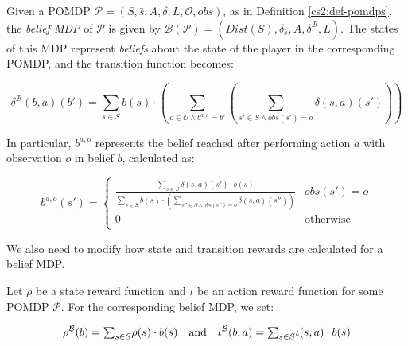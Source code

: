 \begin{definition}
    \label{cs2:belief_mdps}

    Given a POMDP $\mathcal{P} = (S, \bar{s}, A, \delta, L, \mathcal{O}, obs)$, as in Definition \ref{cs2:def-pomdps}, the \emph{belief MDP} of $\mathcal{P}$ is given by $\mathcal{B}(\mathcal{P}) = (Dist(S), \delta_{\bar{s}}, A, \delta^\mathcal{B}, L)$. The states of this MDP represent \emph{beliefs} about the state of the player in the corresponding POMDP, and the transition function becomes:

    \begin{equation*}
        \delta^{\mathcal{B}}(b, a)(b') = \mbox{$\sum_{s \in S}$} b(s) \cdot \left( \mbox{$\sum_{o \in \mathcal{O} \wedge b^{a,o} = b'}$} \left(  \mbox{$\sum_{s' \in S \wedge obs(s')=o}$} \delta(s, a)(s') \right) \right)
    \end{equation*}

    In particular, $b^{a, o}$ represents the belief reached after performing action $a$ with observation $o$ in belief $b$, calculated as:

    \begin{equation*}
        b^{a, o}(s') =
        \begin{cases}
            \frac{\displaystyle \mbox{$\sum\nolimits_{s \in S}$} \delta(s, a)(s') \cdot b(s)}{\displaystyle \mbox{$\sum\nolimits_{s \in S}$} b(s) \cdot \left(\mbox{$\sum_{s'' \in S \wedge obs(s'')=o}$} \delta(s,a)(s'')\right)} & obs(s') = o \\ 0 & \text{otherwise} \\
        \end{cases}
    \end{equation*}

\end{definition}

We also need to modify how state and transition rewards are calculated for a belief MDP.

\begin{definition}
    \label{cs2:belief_rewards}
    Let $\rho$ be a state reward function and $\iota$ be an action reward function for some POMDP $\mathcal{P}$. For the corresponding belief MDP, we set:

\[        \rho^{\mathcal{B}}(b) = \mbox{$\sum_{s \in S}$} \rho(s) \cdot b(s) \quad \mbox{and} \quad
        \iota^{\mathcal{B}}(b, a) = \mbox{$\sum_{s \in S}$} \iota(s, a) \cdot b(s) \\ 
\]
\end{definition}

